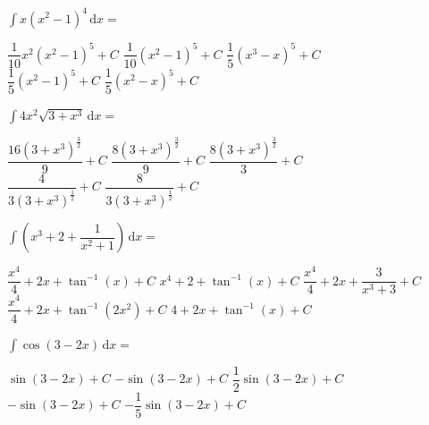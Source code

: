 \begin{questions}
    \question $\int x\left(x^2 - 1\right)^4 \,\mathrm{d}x = $ \\

    \begin{oneparchoices}
        \choice $\dfrac{1}{10}x^2\left(x^2 - 1\right)^5 + C$
        \choice $\dfrac{1}{10}\left(x^2 - 1\right)^5 + C$
        \choice $\dfrac{1}{5}\left(x^3 - x\right)^5 + C$ \\[11pt]
        \makebox[0.22\textwidth] \choice $\dfrac{1}{5}\left(x^2 - 1\right)^5 + C$
        \makebox[0.22\textwidth] \choice $\dfrac{1}{5}\left(x^2 - x\right)^5 + C$
    \end{oneparchoices} \par \horizontalline

    \question $\int 4x^2\sqrt{3 + x^3} \,\mathrm{d}x = $ \\

    \begin{oneparchoices}
        \choice $\dfrac{16\left(3 + x^3\right)^{\frac{3}{2}}}{9} + C$
        \choice $\dfrac{8\left(3 + x^3\right)^{\frac{3}{2}}}{9} + C$
        \choice $\dfrac{8\left(3 + x^3\right)^{\frac{3}{2}}}{3} + C$ \\[11pt]
        \makebox[0.22\textwidth] \choice $\dfrac{4}{3\left(3 + x^3\right)^{\frac{1}{2}}} + C$ 
        \makebox[0.21\textwidth] \choice $\dfrac{8}{3\left(3 + x^3\right)^{\frac{1}{2}}} + C$
    \end{oneparchoices} \par \horizontalline

    \question $\int \left(x^3 + 2 + \dfrac{1}{x^2 + 1}\right) \,\mathrm{d}x = $ \\

    \begin{oneparchoices}
        \choice $\dfrac{x^4}{4} + 2x + \tan^{-1} (x) + C$
        \choice $x^4 + 2 + \tan^{-1} (x) + C$
        \choice $\dfrac{x^4}{4} + 2x + \dfrac{3}{x^3 + 3} + C$ \\[11pt]
        \makebox[0.16\textwidth] \choice $\dfrac{x^4}{4} + 2x + \tan^{-1} \left(2x^2\right) + C$
        \makebox[0.09\textwidth] \choice $4 + 2x + \tan^{-1} (x) + C$
    \end{oneparchoices} \par \horizontalline

    \question $\int \cos (3 - 2x) \,\mathrm{d}x = $ \\

    \begin{oneparchoices}
        \choice $\sin (3 - 2x) + C$
        \choice $-\sin (3 - 2x) + C$
        \choice $\dfrac{1}{2}\sin (3 - 2x) + C$ \\[11pt]
        \makebox[0.18\textwidth] \choice $-\sin (3 - 2x) + C$
        \makebox[0.22\textwidth] \choice $-\dfrac{1}{5}\sin (3 - 2x) + C$
    \end{oneparchoices} \par \horizontalline


\end{questions}
